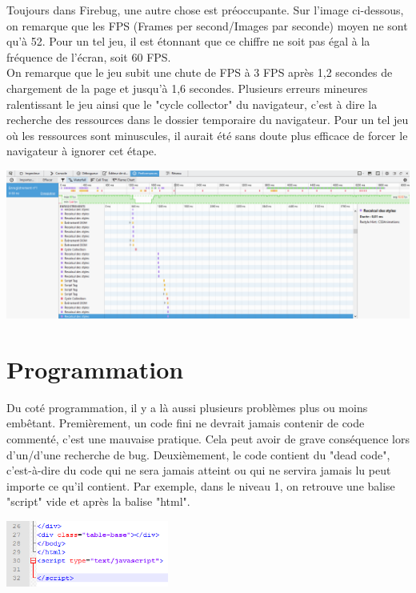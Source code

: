 \documentclass{article}
\begin{document}
Toujours dans Firebug, une autre chose est préoccupante. Sur l'image ci-dessous, on remarque que les FPS (Frames per second/Images par seconde) moyen ne sont qu'à 52. Pour un tel jeu, il est étonnant que ce chiffre ne soit pas égal à la fréquence de l'écran, soit 60 FPS. \\

On remarque que le jeu subit une chute de FPS à 3 FPS après 1,2 secondes de chargement de la page et jusqu'à 1,6 secondes. Plusieurs erreurs mineures ralentissant le jeu ainsi que le "cycle collector" du navigateur, c'est à dire la recherche des ressources dans le dossier temporaire du navigateur. Pour un tel jeu où les ressources sont minuscules, il aurait été sans doute plus efficace de forcer le navigateur à ignorer cet étape.
\begin{center}
\vspace{0.5cm}
\includegraphics[width=\textwidth]{8}\\
\end{center}

\newpage

\section{Programmation}

\hspace*{0.6cm}Du coté programmation, il y a là aussi plusieurs problèmes plus ou moins embêtant. Premièrement, un code fini ne devrait jamais contenir de code commenté, c'est une mauvaise pratique. Cela peut avoir de grave conséquence lors d'un/d'une recherche de bug. Deuxièmement, le code contient du "dead code", c'est-à-dire du code qui ne sera jamais atteint ou qui ne servira jamais lu peut importe ce qu'il contient. Par exemple, dans le niveau 1, on retrouve une balise "script" vide et après la balise "html".

\vspace{0.4cm}
\includegraphics[width=0.40\textwidth]{9}\\
\end{document}
